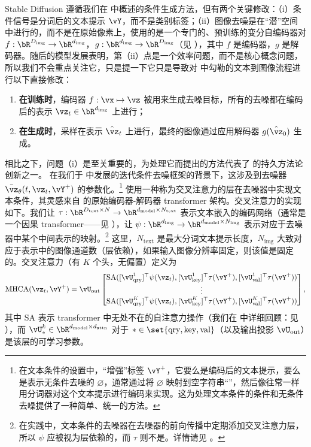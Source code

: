 \documentclass[../../book-main.tex]{subfiles}
\begin{document}
Stable Diffusion 遵循我们在  中概述的条件生成方法，但有两个关键修改：（i）条件信号是分词后的文本提示 $\vY$，而不是类别标签；（ii）图像去噪是在“潜”空间中进行的，而不是在原始像素上，使用的是一个专门的、预训练的变分自编码器对 $f : \bR^{D_{\mathrm{img}}} \to \bR^{d_{\mathrm{img}}}$，$g : \bR^{d_{\mathrm{img}}} \to \bR^{D_{\mathrm{img}}}$（见 ），其中 $f$ 是编码器，$g$ 是解码器。随后的模型发展表明，第（ii）点是一个效率问题，而不是核心概念问题，所以我们不会重点关注它，只是提一下它只是导致对  中勾勒的文本到图像流程进行以下直接修改：
\begin{enumerate}
  \item \textbf{在训练时}，编码器 $f : \vx \mapsto \vz$ 被用来生成去噪目标，所有的去噪都在编码后的表示 $\vz_t \in \bR^{d_{\mathrm{img}}}$ 上进行；
  \item \textbf{在生成时}，采样在表示 $\hat{\vz}_t$ 上进行，最终的图像通过应用解码器 $g(\hat{\vz}_0)$ 生成。
\end{enumerate}
相比之下，问题（i）是至关重要的，为处理它而提出的方法代表了 \textcite{rombach2022high} 的持久方法论创新之一。
在我们于  中发展的迭代条件去噪框架的背景下，这涉及到去噪器 $\bar{\vz}_{\theta}(t, \vz_t, \vY^+)$ 的参数化。\footnote{在文本条件的设置中，“增强”标签 $\vY^+$，它要么是编码后的文本提示，要么是表示无条件去噪的 $\varnothing$，通常通过将 $\varnothing$ 映射到空字符串“”，然后像往常一样用分词器对这个文本提示进行编码来实现。这为处理文本条件的条件和无条件去噪提供了一种简单、统一的方法。}
\textcite{rombach2022high} 使用一种称为交叉注意力的层在去噪器中实现文本条件，其灵感来自 \textcite{vaswani2017attention} 的原始编码器-解码器 transformer 架构。交叉注意力的实现如下。我们让 $\tau : \bR^{D_{\mathrm{text}} \times N} \to \bR^{d_{\mathrm{model}} \times N_{\mathrm{text}}}$ 表示文本嵌入的编码网络（通常是一个因果 transformer——见 ），让 $\psi : \bR^{d_{\mathrm{img}}} \to \bR^{d_{\mathrm{model}} \times N_{\mathrm{img}}}$ 表示对应于去噪器中某个中间表示的映射。\footnote{在实践中，文本条件的去噪器在去噪器的前向传播中定期添加交叉注意力层，所以 $\psi$ 应被视为层依赖的，而 $\tau$ 则不是。详情请见 \textcite{rombach2022high}。} 这里，$N_{\mathrm{text}}$ 是最大分词文本提示长度，$N_{\mathrm{img}}$ 大致对应于表示中的图像通道数（层依赖），如果输入图像分辨率固定，则该值是固定的。交叉注意力（有 $K$ 个头，无偏置）定义为
    \begin{equation}
      \mathrm{MHCA}(\vz_t, \vY^+) \label{eq:mhca}
        = \vU_{\out}\mat{\SA([\vU_{\query}^{1}]^{\top}\psi(\vz_t),
        [\vU_{\key}^{1}]^{\top}\tau(\vY^+), [\vU_{\val}^{1}]^{\top}\tau(\vY^+)) \\ \vdots \\
        \SA([\vU_{\query}^{K}]^{\top}\psi(\vz_t),
        [\vU_{\key}^{K}]^{\top}\tau(\vY^+),
        [\vU_{\val}^{K}]^{\top}\tau(\vY^+))}, %
    \end{equation}
其中 $\mathrm{SA}$ 表示 transformer 中无处不在的自注意力操作（我们在  中详细回顾：见 ），而 $\vU_{*}^{k} \in \bR^{d_{\mathrm{model}}\times d_{\mathrm{attn}} }$ 对于 $* \in \set{\mathrm{qry}, \mathrm{key}, \mathrm{val}}$（以及输出投影 $\vU_{\mathrm{out}}$）是该层的可学习参数。
\end{document}
